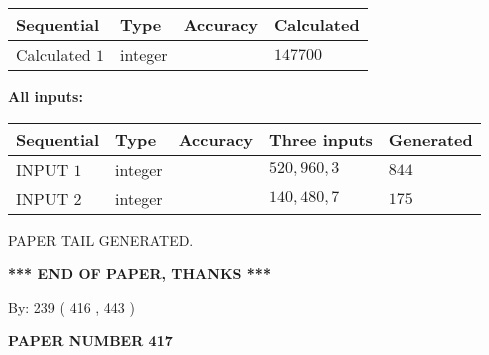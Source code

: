 \documentclass{ctexart}
\begin{document}
   
   
   
\noindent{}
   
   
  
  
\noindent\begin{tabular}{|l|l|l|l|}
\hline
 Sequential & Type & Accuracy & Calculated \\ 
\hline
 
 
  Calculated $  1 $ & integer &  & 
  $ 147700 $ 
 \\  \hline  
 \end{tabular}
   
   
   
   
\noindent\vspace{0.1in}\hspace{-0.08in} {\textbf{\Large{All inputs: }}}
   
   
  
  
\noindent\begin{tabular}{|l|l|l|l|l|}
\hline
 Sequential & Type & Accuracy & Three inputs & Generated \\ 
\hline
 
 
  INPUT $  1 $ & integer &  & $
 520
 , 
 960
 , 
 3
 $ & $ 844 $ 
 \\  \hline  
 
 
  INPUT $  2 $ & integer &  & $
 140
 , 
 480
 , 
 7
 $ & $ 175 $ 
 \\  \hline  
 \end{tabular}
   
   
   
   
   
   
 \vspace{0.2in}
 
   
   
\vspace{2.0in} PAPER TAIL GENERATED.
   
   
   
   
\vspace{1.0in} 
{\textbf{\large{ *** END OF PAPER, THANKS *** }}} 
   
   
\hspace{1.0in} By: 
 239 ( 416 ,  443 )
   
   
   
   
\newpage 
\setcounter{page}{ 
   417001 } 
   
   
   
   
 {\textbf{ \Large{ PAPER NUMBER  417  }}}
   
\end{document}
